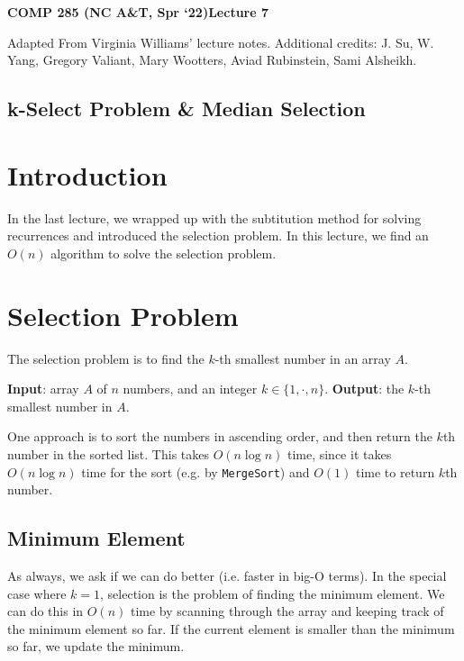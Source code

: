 \documentclass [12pt]{article}
\begin{document}
 

{\LARGE \textbf {COMP 285 (NC A\&T, Spr `22)}\hfill \textbf {Lecture 7} } 
\vspace {1em} 
\begin {Instruction} 

Adapted From Virginia Williams' lecture notes. Additional credits: J. Su, W. Yang, Gregory Valiant, Mary Wootters, Aviad Rubinstein, Sami Alsheikh.
\end {Instruction} 

\begin{centering}
\section*{k-Select Problem \& Median Selection}
\end{centering}

\section{Introduction}
In the last lecture, we wrapped up with the subtitution method for solving recurrences and introduced the selection problem. In this lecture, we find an $O(n)$ algorithm to solve the selection problem.


\section{Selection Problem}
The selection problem is to find the $k$-th smallest number in an array $A$.

\textbf{Input}: array $A$ of $n$ numbers, and an integer $k \in \{1, \cdot , n\}$.
\textbf{Output}: the $k$-th smallest number in $A$.

One approach is to sort the numbers in ascending order, and then return the $k$th number in the sorted list. This takes $O(n \log n)$ time, since it takes $O(n \log n)$ time for the sort (e.g. by \texttt{MergeSort}) and $O(1)$ time to return $k$th number.

\subsection{Minimum Element}
As always, we ask if we can do better (i.e. faster in big-O terms). In the special case where $k = 1$, selection is the problem of finding the minimum element. We can do this in $O(n)$ time by scanning through the array and keeping track of the minimum element so far. If the current element is smaller than the minimum so far, we update the minimum.
\end{document}
